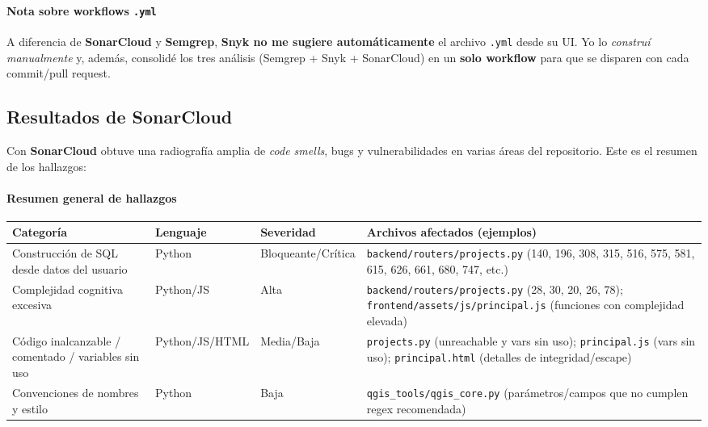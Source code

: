 \documentclass[12pt, a4paper]{article}
\begin{document}
\paragraph{Nota sobre workflows \texorpdfstring{\texttt{.yml}}{}}
A diferencia de \textbf{SonarCloud} y \textbf{Semgrep}, \textbf{Snyk no me sugiere automáticamente} el archivo \texttt{.yml} 
desde su UI. Yo lo \textit{construí manualmente} y, además, consolidé los tres análisis (Semgrep + Snyk + SonarCloud) en un 
\textbf{solo workflow} para que se disparen con cada commit/pull request.

\subsection{Resultados de SonarCloud}
Con \textbf{SonarCloud} obtuve una radiografía amplia de \textit{code smells}, bugs y vulnerabilidades en varias áreas del 
repositorio. Este es el resumen de los hallazgos:

\paragraph{Resumen general de hallazgos}
\begin{table}[h!]\footnotesize\centering
\begin{tabularx}{\textwidth}{@{} L{3.9cm} L{2.2cm} L{2.6cm} Y @{}}
\toprule
\textbf{Categoría} & \textbf{Lenguaje} & \textbf{Severidad} & \textbf{Archivos afectados (ejemplos)} \\
\midrule
Construcción de SQL desde datos del usuario & Python & Bloqueante/Crítica & \texttt{backend/routers/projects.py} (140, 196, 308, 315, 516, 575, 581, 615, 626, 661, 680, 747, etc.) \\
Complejidad cognitiva excesiva & Python/JS & Alta & \texttt{backend/routers/projects.py} (28, 30, 20, 26, 78); \texttt{frontend/assets/js/principal.js} (funciones con complejidad elevada) \\
Código inalcanzable / comentado / variables sin uso & Python/JS/HTML & Media/Baja & \texttt{projects.py} (unreachable y vars sin uso); \texttt{principal.js} (vars sin uso); \texttt{principal.html} (detalles de integridad/escape) \\
Convenciones de nombres y estilo & Python & Baja & \texttt{qgis\_tools/qgis\_core.py} (parámetros/campos que no cumplen regex recomendada) \\
\bottomrule
\end{tabularx}
\end{table}
\end{document}
